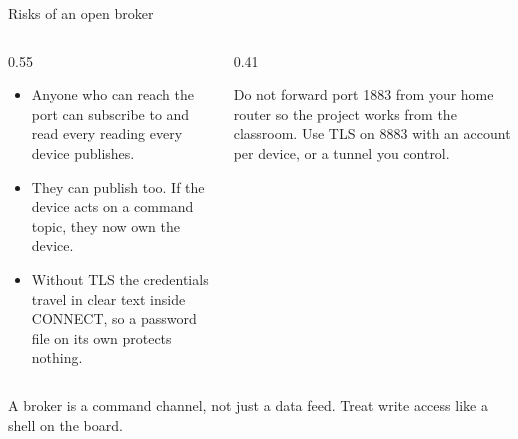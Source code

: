\documentclass[10pt,aspectratio=169,t]{beamer}
\begin{document}
\begin{frame}[embedded,eyebrow=Trust]{Risks of an open broker}
  \vskip 2mm
  \begin{columns}[T]
    \begin{column}{0.55\textwidth}
      \begin{itemize}
        \item Anyone who can reach the port can subscribe to \code{\#} and read every reading every device publishes.
        \item They can publish too. If the device acts on a command topic, they now own the device.
        \item Without TLS the credentials travel in clear text inside CONNECT, so a password file on its own protects nothing.
      \end{itemize}
    \end{column}
    \begin{column}{0.41\textwidth}
      \begin{warning}
        Do not forward port 1883 from your home router so the project works from the classroom. Use TLS on 8883 with an account per device, or a tunnel you control.
      \end{warning}
    \end{column}
  \end{columns}
  \begin{takeaway}{A broker is a command channel, not just a data feed.}
    Treat write access like a shell on the board.
  \end{takeaway}
\end{frame}
\end{document}
